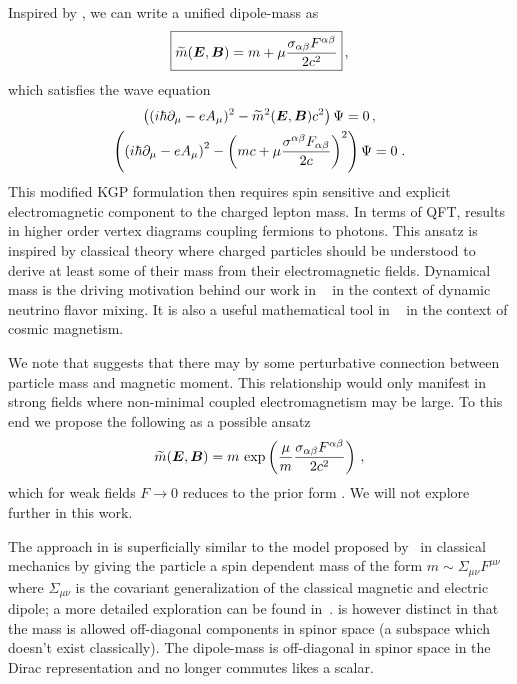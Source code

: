 Inspired by , we can write a unified dipole-mass as
\begin{alignat}{1}
    \label{eq:ext:01} \boxed{\widetilde{m}(\boldsymbol{E},\boldsymbol{B}) = m +\mu\frac{\sigma_{\alpha\beta}F^{\alpha\beta}}{2c^{2}}}\,,
\end{alignat}
which satisfies the wave equation
\begin{gather}
\label{eq:ext:02} \left((i\hbar\partial_{\mu}-eA_{\mu})^{2}-\widetilde{m}^{2}(\boldsymbol{E},\boldsymbol{B})c^{2}\right)\Psi=0\,,\\
\label{IKGP01} \left(\left(i\hbar\partial_{\mu}-eA_{\mu}\right)^{2}-\left(mc+\mu\frac{\sigma^{\alpha\beta}F_{\alpha\beta}}{2c}\right)^{2}\right)\Psi=0\;.
\end{gather}
This modified KGP formulation then requires spin sensitive and explicit electromagnetic component to the charged lepton mass. In terms of QFT,  results in higher order vertex diagrams coupling fermions to photons. This ansatz is inspired by classical theory where charged particles should be understood to derive at least some of their mass from their electromagnetic fields. Dynamical mass is the driving motivation behind our work in ~\citep{Rafelski:2023zgp} in the context of dynamic neutrino flavor mixing. It is also a useful mathematical tool in ~\citep{Steinmetz:2023nsc} in the context of cosmic magnetism.

We note that  suggests that there may by some perturbative connection between particle mass and magnetic moment. This relationship would only manifest in strong fields where non-minimal coupled electromagnetism may be large. To this end we propose the following as a possible ansatz
\begin{alignat}{1}
	\label{mass:eq:10} \widetilde{m}(\boldsymbol{E},\boldsymbol{B}) = m\,\exp\left(\frac{\mu}{m}\frac{\sigma_{\alpha\beta}F^{\alpha\beta}}{2c^{2}}\right)\,,
\end{alignat}
which for weak fields $F\rightarrow0$ reduces to the prior form . We will not explore  further in this work.

The approach in  is superficially similar to the model proposed by~\cite{Frenkel:1926zz} in classical mechanics by giving the particle a spin dependent mass of the form $m\sim\Sigma_{\mu\nu}F^{\mu\nu}$ where $\Sigma_{\mu\nu}$ is the covariant generalization of the classical magnetic and electric dipole; a more detailed exploration can be found in~\cite{Formanek:2020ojr}.  is however distinct in that the mass is allowed off-diagonal components in spinor space (a subspace which doesn't exist classically). The dipole-mass  is off-diagonal in spinor space in the Dirac representation and no longer commutes likes a scalar.

